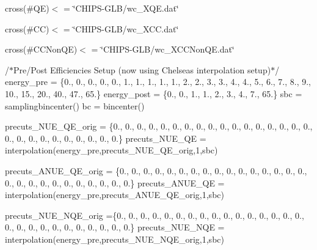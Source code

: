 cross(\#\+QE)$<$  = \char`\"{}\+C\+H\+I\+P\+S-\/\+G\+L\+B/wc\+\_\+\+X\+Q\+E.\+dat\char`\"{} \begin{quote}


\end{quote}


cross(\#\+CC)$<$  = \char`\"{}\+C\+H\+I\+P\+S-\/\+G\+L\+B/wc\+\_\+\+X\+C\+C.\+dat\char`\"{} \begin{quote}


\end{quote}


cross(\#\+C\+C\+Non\+QE)$<$  = \char`\"{}\+C\+H\+I\+P\+S-\/\+G\+L\+B/wc\+\_\+\+X\+C\+C\+Non\+Q\+E.\+dat\char`\"{} \begin{quote}


\end{quote}


/$\ast$\+Pre/\+Post Efficiencies Setup (now using Chelsea\textquotesingle{}s interpolation setup)$\ast$/ energy\+\_\+pre = \{0., 0., 0., 0., 0., 1., 1., 1., 1., 1., 2., 2., 3., 3., 4., 4., 5., 6., 7., 8., 9., 10., 15., 20., 40., 47., 65.\} energy\+\_\+post = \{0., 0., 1., 1., 2., 3., 4., 7., 65.\} sbc = samplingbincenter() bc = bincenter()

precuts\+\_\+\+N\+U\+E\+\_\+\+Q\+E\+\_\+orig = \{0., 0., 0., 0., 0., 0., 0., 0., 0., 0., 0., 0., 0., 0., 0., 0., 0., 0., 0., 0., 0., 0., 0., 0., 0., 0., 0.\} precuts\+\_\+\+N\+U\+E\+\_\+\+QE = interpolation(energy\+\_\+pre,precuts\+\_\+\+N\+U\+E\+\_\+\+Q\+E\+\_\+orig,1,sbc)

precuts\+\_\+\+A\+N\+U\+E\+\_\+\+Q\+E\+\_\+orig = \{0., 0., 0., 0., 0., 0., 0., 0., 0., 0., 0., 0., 0., 0., 0., 0., 0., 0., 0., 0., 0., 0., 0., 0., 0., 0., 0.\} precuts\+\_\+\+A\+N\+U\+E\+\_\+\+QE = interpolation(energy\+\_\+pre,precuts\+\_\+\+A\+N\+U\+E\+\_\+\+Q\+E\+\_\+orig,1,sbc)

precuts\+\_\+\+N\+U\+E\+\_\+\+N\+Q\+E\+\_\+orig =\{0., 0., 0., 0., 0., 0., 0., 0., 0., 0., 0., 0., 0., 0., 0., 0., 0., 0., 0., 0., 0., 0., 0., 0., 0., 0., 0.\} precuts\+\_\+\+N\+U\+E\+\_\+\+N\+QE = interpolation(energy\+\_\+pre,precuts\+\_\+\+N\+U\+E\+\_\+\+N\+Q\+E\+\_\+orig,1,sbc)

